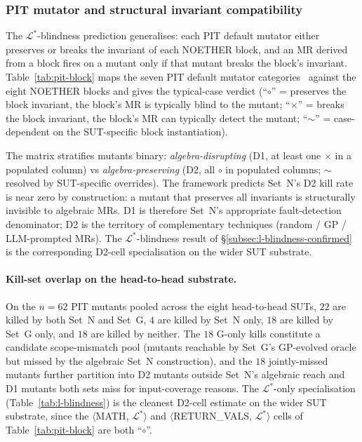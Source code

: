 \documentclass[manuscript]{acmart}
\begin{document}
\subsubsection{PIT mutator and structural invariant compatibility}
\label{subsec:pit-block-matrix}

The $\mathcal{L}^{*}$-blindness prediction generalises: each PIT
default mutator either preserves or breaks the invariant of each
NOETHER block, and an MR derived from a block fires on a mutant only
if that mutant breaks the block's invariant. Table~\ref{tab:pit-block}
maps the seven PIT default mutator categories~\cite{Coles2016PIT}
against the eight NOETHER blocks and gives the typical-case verdict
(``$\circ$'' = preserves the block invariant, the block's MR is
typically blind to the mutant; ``$\times$'' = breaks the block
invariant, the block's MR can typically detect the mutant; ``$\sim$''
= case-dependent on the SUT-specific block instantiation).

The matrix stratifies mutants binary: \emph{algebra-disrupting} (D1, at least one $\times$ in a populated column) vs \emph{algebra-preserving} (D2, all $\circ$ in populated columns; $\sim$ resolved by SUT-specific overrides). The framework predicts Set~N's D2 kill rate is near zero by construction: a mutant that preserves all invariants is structurally invisible to algebraic MRs. D1 is therefore Set~N's appropriate fault-detection denominator; D2 is the territory of complementary techniques (random / GP / LLM-prompted MRs). The $\mathcal{L}^{*}$-blindness result of \S\ref{subsec:l-blindness-confirmed} is the corresponding D2-cell specialisation on the wider SUT substrate.

\paragraph{Kill-set overlap on the head-to-head substrate.}
On the $n = 62$ PIT mutants pooled across the eight head-to-head
SUTs, $22$ are killed by both Set~N and Set~G, $4$ are killed by
Set~N only, $18$ are killed by Set~G only, and $18$ are killed by
neither. The $18$ G-only kills constitute a candidate scope-mismatch
pool (mutants reachable by Set~G's GP-evolved oracle but missed by
the algebraic Set~N construction), and the $18$ jointly-missed
mutants further partition into D2 mutants outside Set~N's algebraic
reach and D1 mutants both sets miss for input-coverage reasons.
The $\mathcal{L}^{*}$-only specialisation
(Table~\ref{tab:l-blindness}) is the cleanest D2-cell estimate on
the wider SUT substrate, since the
$\langle$MATH, $\mathcal{L}^{*}\rangle$ and
$\langle$RETURN\_VALS, $\mathcal{L}^{*}\rangle$ cells of
Table~\ref{tab:pit-block} are both ``$\circ$''.
\end{document}

